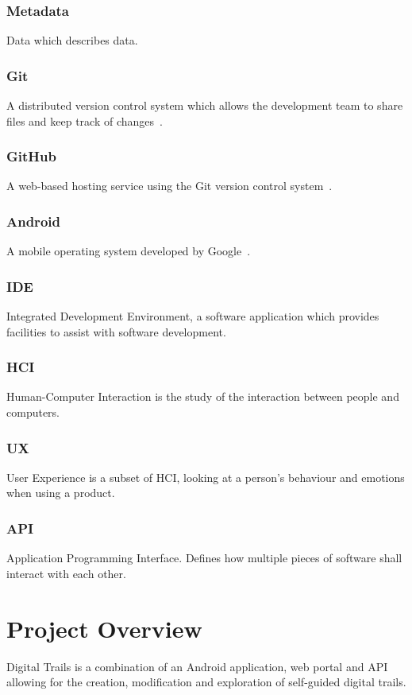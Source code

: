 \documentclass[11pt,a4paper]{report}
\begin{document}
\subsubsection{Metadata}
Data which describes data.

\subsubsection{Git}
A distributed version control system which allows the development team to share files and keep track of changes~\cite{git}.

\subsubsection{GitHub}
A web-based hosting service using the Git version control system~\cite{github}.

\subsubsection{Android}
A mobile operating system developed by Google~\cite{android}. 

\subsubsection{IDE}
Integrated Development Environment, a software application which provides facilities to assist with software development.

\subsubsection{HCI}
Human-Computer Interaction is the study of the interaction between people and computers.

\subsubsection{UX}
User Experience is a subset of HCI, looking at a person's behaviour and emotions when using a product.

\subsubsection{API}
Application Programming Interface. Defines how multiple pieces of software shall interact with each other.

\section{Project Overview}
\label{sec:project-overview}
Digital Trails is a combination of an Android application, web portal and API  allowing for the creation, modification and exploration of self-guided digital trails.
\end{document}
